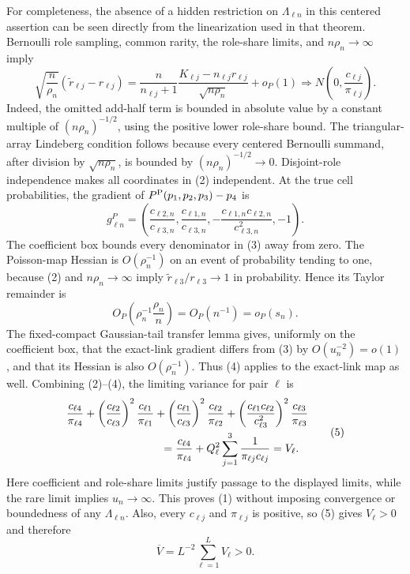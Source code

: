 For completeness, the absence of a hidden restriction on
\(\Lambda_{\ell n}\) in this centered assertion can be seen directly from the
linearization used in that theorem.  Bernoulli role sampling, common rarity,
the role-share limits, and \(n\rho_n\to\infty\) imply
\[
 \sqrt{\frac n{\rho_n}}
   (\widetilde r_{\ell j}-r_{\ell j})
 =\frac{n}{n_{\ell j}+1}
   \frac{K_{\ell j}-n_{\ell j}r_{\ell j}}{\sqrt{n\rho_n}}
   +o_{P}(1)
 \Rightarrow N\!\left(0,\frac{c_{\ell j}}{\pi_{\ell j}}\right).
 \tag{2}
\]
Indeed, the omitted add-half term is bounded in absolute value by a constant
multiple of \((n\rho_n)^{-1/2}\), using the positive lower role-share bound.
The triangular-array Lindeberg condition follows because every centered
Bernoulli summand, after division by \(\sqrt{n\rho_n}\), is bounded by
\((n\rho_n)^{-1/2}\to0\).  Disjoint-role independence makes all coordinates in
(2) independent.  At the true cell probabilities, the gradient of
\(P^{\rm P}(p_1,p_2,p_3)-p_4\) is
\[
 g_{\ell n}^{P}
 =\left(
   \frac{c_{\ell2,n}}{c_{\ell3,n}},
   \frac{c_{\ell1,n}}{c_{\ell3,n}},
   -\frac{c_{\ell1,n}c_{\ell2,n}}{c_{\ell3,n}^{2}},
   -1
 \right).
 \tag{3}
\]
The coefficient box bounds every denominator in (3) away from zero.  The
Poisson-map Hessian is \(O(\rho_n^{-1})\) on an event of probability tending
to one, because (2) and \(n\rho_n\to\infty\) imply
\(\widetilde r_{\ell3}/r_{\ell3}\to1\) in probability.  Hence its Taylor
remainder is
\[
 O_P\!\left(\rho_n^{-1}\frac{\rho_n}{n}\right)
   =O_P(n^{-1})=o_P(s_n).
 \tag{4}
\]
The fixed-compact Gaussian-tail transfer lemma gives, uniformly on the
coefficient box, that the exact-link gradient differs from (3) by
\(O(u_n^{-2})=o(1)\), and that its Hessian is also
\(O(\rho_n^{-1})\).  Thus (4) applies to the exact-link map as well.  Combining
(2)--(4), the limiting variance for pair \(\ell\) is
\[
 \begin{aligned}
 &\frac{c_{\ell4}}{\pi_{\ell4}}
 +\left(\frac{c_{\ell2}}{c_{\ell3}}\right)^2
    \frac{c_{\ell1}}{\pi_{\ell1}}
 +\left(\frac{c_{\ell1}}{c_{\ell3}}\right)^2
    \frac{c_{\ell2}}{\pi_{\ell2}}
 +\left(\frac{c_{\ell1}c_{\ell2}}{c_{\ell3}^{2}}\right)^2
    \frac{c_{\ell3}}{\pi_{\ell3}} \\
 &\hspace{30mm}
 =\frac{c_{\ell4}}{\pi_{\ell4}}
   +Q_\ell^2\sum_{j=1}^{3}\frac{1}{\pi_{\ell j}c_{\ell j}}
 =V_\ell.
 \end{aligned}
 \tag{5}
\]
Here coefficient and role-share limits justify passage to the displayed
limits, while the rare limit implies \(u_n\to\infty\).  This proves (1)
without imposing convergence or boundedness of any \(\Lambda_{\ell n}\).
Also, every \(c_{\ell j}\) and \(\pi_{\ell j}\) is positive, so (5) gives
\(V_\ell>0\) and therefore
\[
 \overline V=L^{-2}\sum_{\ell=1}^{L}V_\ell>0.
 \tag{6}
\]

